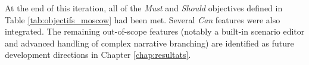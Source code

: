 
At the end of this iteration, all of the \textit{Must} and \textit{Should} objectives defined in Table \ref{tab:objectifs_moscow} had been met. Several \textit{Can} features were also integrated. The remaining out-of-scope features (notably a built-in scenario editor and advanced handling of complex narrative branching) are identified as future development directions in Chapter \ref{chap:resultats}.
